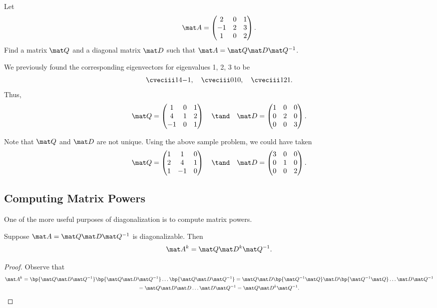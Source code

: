 \begin{sample}
    Let \[\mat A = \begin{pmatrix}2 & 0 & 1 \\ -1 & 2 & 3 \\ 1 & 0 & 2\end{pmatrix}.\] Find a matrix $\mat Q$ and a diagonal matrix $\mat D$ such that $\mat A = \mat Q \mat D \mat Q^{-1}$.
\end{sample}
\begin{sampans}
    We previously found the corresponding eigenvectors for eigenvalues 1, 2, 3 to be \[\cveciii14{-1}, \quad \cveciii010, \quad \cveciii121.\] Thus, \[\mat Q = \begin{pmatrix}1 & 0 & 1 \\ 4 & 1 & 2 \\ -1 & 0 & 1\end{pmatrix} \quad \tand \quad \mat D = \begin{pmatrix}1 & 0 & 0 \\ 0 & 2 & 0 \\ 0 & 0 & 3 \end{pmatrix}.\]
\end{sampans}

Note that $\mat Q$ and $\mat D$ are not unique. Using the above sample problem, we could have taken \[\mat Q = \begin{pmatrix}1 & 1 & 0 \\ 2 & 4 & 1 \\ 1 & -1 & 0\end{pmatrix} \quad \tand \quad \mat D = \begin{pmatrix}3 & 0 & 0 \\ 0 & 1 & 0 \\ 0 & 0 & 2\end{pmatrix}.\]

\subsection{Computing Matrix Powers}

One of the more useful purposes of diagonalization is to compute matrix powers.

\begin{proposition}
    Suppose $\mat A = \mat Q \mat D \mat Q^{-1}$ is diagonalizable. Then \[\mat A^k = \mat Q \mat D^k \mat Q^{-1}.\]
\end{proposition}
\begin{proof}
    Observe that
    \begin{gather*}
        \mat A^k = \bp{\mat Q \mat D \mat Q^{-1}}\bp{\mat Q \mat D \mat Q^{-1}}\dots\bp{\mat Q \mat D \mat Q^{-1}} = \mat Q \mat D \bp{\mat Q^{-1} \mat Q} \mat D \bp{\mat Q^{-1} \mat Q} \dots \mat D \mat Q^{-1}\\
        = \mat Q \mat D \mat D \dots \mat D \mat Q^{-1} = \mat Q \mat D^{k} \mat Q^{-1}.
    \end{gather*}
\end{proof}

